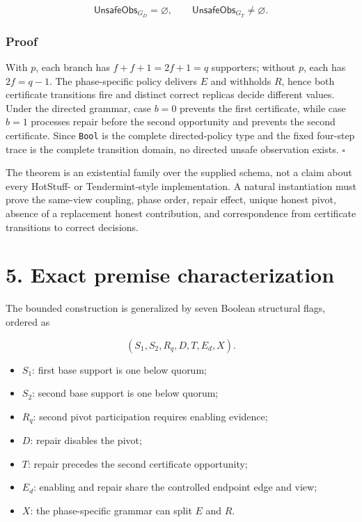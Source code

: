 \documentclass[10pt,a4paper]{article}
\newcommand{\tightlist}{\setlength{\itemsep}{0pt}\setlength{\parskip}{0pt}}
\begin{document}
\[
\mathsf{UnsafeObs}_{G_D}=\varnothing,
\qquad
\mathsf{UnsafeObs}_{G_T}\neq\varnothing.
\]

\subsubsection{Proof}\label{proof-1}

With \(p\), each branch has \(f+f+1=2f+1=q\) supporters; without \(p\),
each has \(2f=q-1\). The phase-specific policy delivers \(E\) and
withholds \(R\), hence both certificate transitions fire and distinct
correct replicas decide different values. Under the directed grammar,
case \(b=0\) prevents the first certificate, while case \(b=1\)
processes repair before the second opportunity and prevents the second
certificate. Since \texttt{Bool} is the complete directed-policy type
and the fixed four-step trace is the complete transition domain, no
directed unsafe observation exists. \(\square\)

The theorem is an existential family over the supplied schema, not a
claim about every HotStuff- or Tendermint-style implementation. A
natural instantiation must prove the same-view coupling, phase order,
repair effect, unique honest pivot, absence of a replacement honest
contribution, and correspondence from certificate transitions to correct
decisions.

\section{5. Exact premise
characterization}\label{exact-premise-characterization}

The bounded construction is generalized by seven Boolean structural
flags, ordered as

\[
(S_1,S_2,R_q,D,T,E_d,X).
\]

\begin{itemize}
\tightlist
\item
  \(S_1\): first base support is one below quorum;
\item
  \(S_2\): second base support is one below quorum;
\item
  \(R_q\): second pivot participation requires enabling evidence;
\item
  \(D\): repair disables the pivot;
\item
  \(T\): repair precedes the second certificate opportunity;
\item
  \(E_d\): enabling and repair share the controlled endpoint edge and
  view;
\item
  \(X\): the phase-specific grammar can split \(E\) and \(R\).
\end{itemize}
\end{document}
